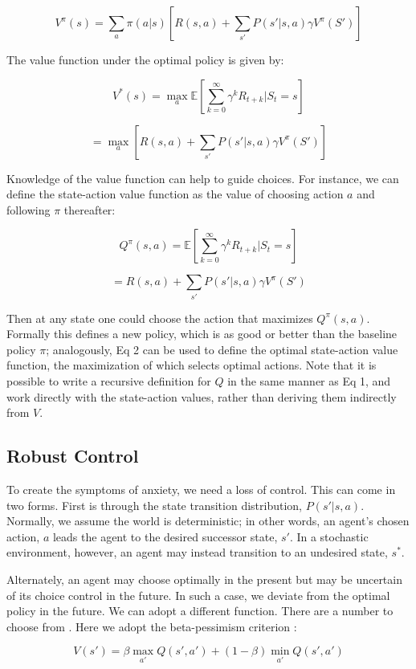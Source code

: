 \documentclass[11pt]{article} %
\begin{document}
$$ V^\pi(s) = \sum_a \pi(a|s) \left[ R(s,a) + \sum_{s'} P(s'|s,a) \gamma V^\pi (S') \right] $$

The value function under the optimal policy is given by:

$$ V^*(s) = \max_a \mathbb{E} \left[ \sum^{\infty}_{k=0} \gamma^k R_{t+k} | S_t = s \right] $$

$$ = \max_a \left[ R(s,a) + \sum_{s'} P(s'|s,a) \gamma V^\pi (S') \right] $$

Knowledge of the value function can help to guide choices. For instance, we can
define the state-action value function as the value of choosing action $a$ and
following $\pi$ thereafter:

$$ Q^\pi(s,a) = \mathbb{E} \left[ \sum^{\infty}_{k=0} \gamma^k R_{t+k} | S_t = s \right] $$

$$ = R(s,a) + \sum_{s'} P(s'|s,a) \gamma V^\pi (S') $$

Then at any state one could choose the action that maximizes $Q^\pi(s,a)$. Formally
this defines a new policy, which is as good or better than the baseline policy
$\pi$; analogously, Eq 2 can be used to define the optimal state-action value
function, the maximization of which selects optimal actions. Note that it is
possible to write a recursive definition for $Q$ in the same manner as Eq 1, and
work directly with the state-action values, rather than deriving them indirectly
from $V$.

\subsection{Robust Control}

To create the symptoms of anxiety, we need a loss of control. This can come in
two forms. First is through the state transition distribution, $P(s'|s,a)$.
Normally, we assume the world is deterministic; in other words, an agent's chosen
action, $a$ leads the agent to the desired successor state, $s'$. In a stochastic
environment, however, an agent may instead transition to an undesired state, $s^*$.

Alternately, an agent may choose optimally in the present but may be uncertain of
its choice control in the future. In such a case, we deviate from the optimal
policy in the future. We can adopt a different function. There are a number to
choose from \cite{Garcia2015}. Here we adopt the beta-pessimism criterion
\cite{Gaskett2003}:

$$ V(s') = \beta \max_{a'} Q(s',a') + (1 - \beta) \min_{a'} Q(s',a') $$
\end{document}
